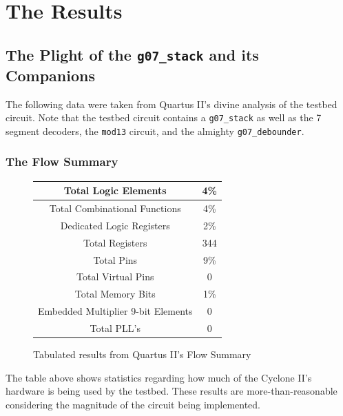 \documentclass[12pt]{report}
\begin{document}
\part{The Results}
\chapter*{The Plight of the \texttt{g07\_stack} and its Companions}
The following data were taken from Quartus II's divine analysis of the testbed circuit. Note that
the testbed circuit contains a \texttt{g07\_stack} as well as the 7 segment decoders, the
\texttt{mod13} circuit, and the almighty \texttt{g07\_debounder}.
\section*{The Flow Summary}
\begin{figure}[h]
	\begin{center}
		\caption{Tabulated results from Quartus II's Flow Summary}
		\begin{tabular}{|c|c|}
			\hline
			\textbf{Total Logic Elements} & 4\%\\\hline
			Total Combinational Functions & 4\%\\\hline
			Dedicated Logic Registers & 2\%\\\hline
			Total Registers & 344\\\hline
			Total Pins & 9\%\\\hline
			Total Virtual Pins & 0\\\hline
			Total Memory Bits & 1\%\\\hline
			Embedded Multiplier 9-bit Elements & 0\\\hline
			Total PLL's & 0\\\hline
		\end{tabular}
	\end{center}
\end{figure}

The table above shows statistics regarding how much of the Cyclone II's hardware is being used by
the testbed. These results are more-than-reasonable considering the magnitude of the circuit being
implemented.
\end{document}
